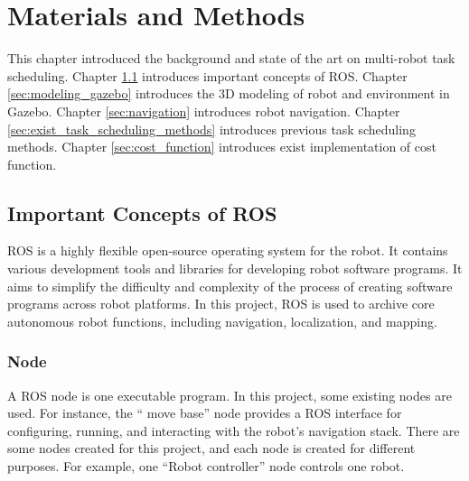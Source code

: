


\chapter{Materials and Methods}

This chapter introduced the background and state of the art on multi-robot task scheduling. Chapter \ref{sec:ros_concepts} introduces important concepts of ROS. Chapter \ref{sec:modeling_gazebo} introduces the 3D modeling of robot and environment in Gazebo. Chapter \ref{sec:navigation} introduces robot navigation. Chapter \ref{sec:exist_task_scheduling_methods} introduces previous task scheduling methods. Chapter \ref{sec:cost_function} introduces exist implementation of cost function.

\section{Important Concepts of ROS}
\label{sec:ros_concepts}
ROS is a highly flexible open-source operating system for the robot. It contains various development tools and libraries for developing robot software programs\cite{Pyo17}. It aims to simplify the difficulty and complexity of the process of creating software programs across robot platforms. In this project, ROS is used to archive core autonomous robot functions, including navigation, localization, and mapping.

\subsection{Node}
A ROS node is one executable program. In this project, some existing nodes are used. For instance, the `` move base'' node provides a ROS interface for configuring, running, and interacting with the robot's navigation stack. There are some nodes created for this project, and each node is created for different purposes. For example, one ``Robot controller'' node controls one robot. 

